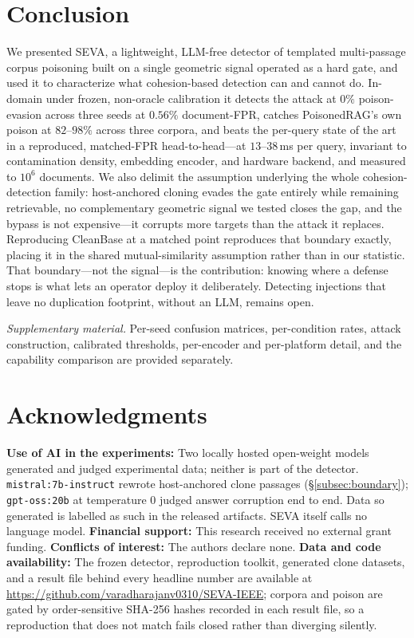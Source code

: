 \documentclass[10pt,journal,compsoc]{IEEEtran}
\begin{document}
\section{Conclusion}
We presented SEVA, a lightweight, LLM-free detector of templated multi-passage corpus
poisoning built on a single geometric signal operated as a hard gate, and used it to
characterize what cohesion-based detection can and cannot do. In-domain under frozen,
non-oracle calibration it detects the attack at $0\%$ poison-evasion across three seeds at
$0.56\%$ document-FPR, catches PoisonedRAG's own poison at $82$--$98\%$ across three corpora,
and beats the per-query state of the art in a reproduced, matched-FPR head-to-head---at
$13$--$38$\,ms per query, invariant to contamination density, embedding encoder, and hardware
backend, and measured to $10^6$ documents. We also delimit the assumption underlying the whole
cohesion-detection family: host-anchored cloning evades the gate entirely while remaining
retrievable, no complementary geometric signal we tested closes the gap, and the bypass is not
expensive---it corrupts more targets than the attack it replaces. Reproducing CleanBase at a
matched point reproduces that boundary exactly, placing it in the shared mutual-similarity
assumption rather than in our statistic. That boundary---not the signal---is the contribution:
knowing where a defense stops is what lets an operator deploy it deliberately. Detecting
injections that leave no duplication footprint, without an LLM, remains open.

\noindent\emph{Supplementary material.} Per-seed confusion matrices, per-condition rates,
attack construction, calibrated thresholds, per-encoder and per-platform detail, and the
capability comparison are provided separately.

\section*{Acknowledgments}
\textbf{Use of AI in the experiments:} Two locally hosted open-weight models generated and judged experimental data; neither is part of the detector. \texttt{mistral:7b-instruct} rewrote host-anchored clone passages (\S\ref{subsec:boundary}); \texttt{gpt-oss:20b} at temperature $0$ judged answer corruption end to end. Data so generated is labelled as such in the released artifacts. SEVA itself calls no language model.
\textbf{Financial support:} This research received no external grant funding. \textbf{Conflicts of interest:} The authors declare none. \textbf{Data and code availability:} The frozen detector, reproduction toolkit, generated clone datasets, and a result file behind every headline number are available at \url{https://github.com/varadharajanv0310/SEVA-IEEE}; corpora and poison are gated by order-sensitive SHA-256 hashes recorded in each result file, so a reproduction that does not match fails closed rather than diverging silently.
\end{document}
